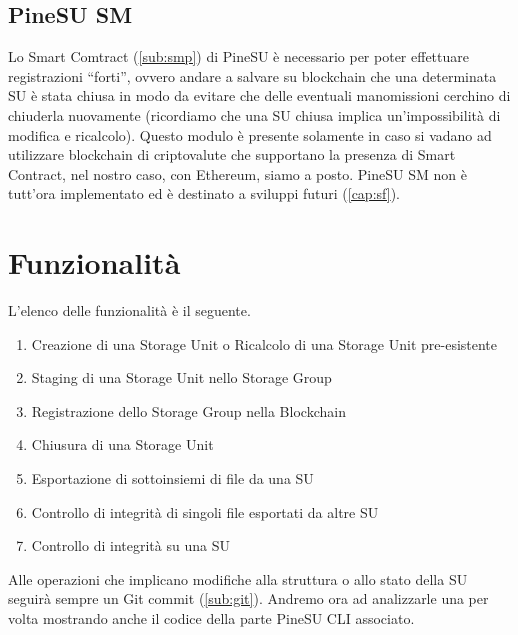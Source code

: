 \subsection{PineSU SM}
\label{sub:sm}
Lo Smart Comtract (\autoref{sub:smp}) di PineSU è necessario
per poter effettuare registrazioni “forti”, ovvero andare a salvare su blockchain
che una determinata SU è stata chiusa in modo da evitare che delle eventuali manomissioni
cerchino di chiuderla nuovamente (ricordiamo che una SU chiusa implica un'impossibilità di modifica e ricalcolo).
Questo modulo è presente solamente in caso si vadano ad utilizzare blockchain di criptovalute che
supportano la presenza di Smart Contract, nel nostro caso, con Ethereum, siamo a posto.
PineSU SM non è tutt'ora implementato ed è destinato a sviluppi futuri (\autoref{cap:sf}).

\newpage

\section{Funzionalità}

L'elenco delle funzionalità è il seguente.

\begin{enumerate}
    \item Creazione di una Storage Unit o Ricalcolo di una Storage Unit pre-esistente
    \item Staging di una Storage Unit nello Storage Group
    \item Registrazione dello Storage Group nella Blockchain
    \item Chiusura di una Storage Unit
    \item Esportazione di sottoinsiemi di file da una SU
    \item Controllo di integrità di singoli file esportati da altre SU
    \item Controllo di integrità su una SU
\end{enumerate}

Alle operazioni che implicano modifiche alla struttura o allo stato della SU seguirà sempre un Git \textsf{commit} (\autoref{sub:git}).
Andremo ora ad analizzarle una per volta mostrando anche il codice della parte PineSU CLI associato.

